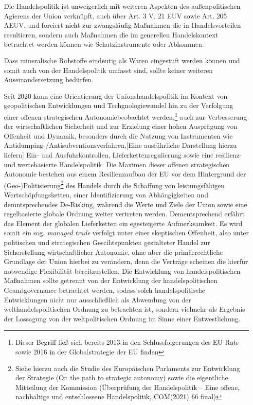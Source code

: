 \documentclass[12pt,a4paper,oneside]{book} %
\begin{document}
Die Handelspolitik ist unweigerlich mit weiteren Aspekten des außenpolitischen Agierens der Union verknüpft, auch über Art. 3 V, 21 EUV sowie Art. 205 AEUV, und forciert nicht zur zwangsläufig Maßnahmen die in Handelsvorteilen resultieren, sondern auch Maßnahmen die im generellen Handelskontext betrachtet werden können wie Schutzinstrumente oder Abkommen.\autocite{Callies/Ruffert, Art. 206, Rn 3.}

Dass mineralische Rohstoffe eindeutig als Waren eingestuft werden können und somit auch von der Handelspolitik umfasst sind, sollte keiner weiteren Auseinandersetzung bedürfen.
	

	
	Seit 2020 kann eine Orientierung der Unionshandelspolitik im Kontext von geopolitischen Entwicklungen und Techgnologiewandel hin zu der Verfolgung einer \glqq offenen strategischen Autonomie\grqq beobachtet werden,\footnote{Dieser Begriff ließ sich bereits 2013 in den Schlussfolgerungen des EU-Rats sowie 2016 in der Globalstrategie der EU finden} auch zur Verbesserung der wirtschaftlichen Sicherheit und zur Erzielung einer hohen Ausprägung von Offenheit und Dynamik, besonders durch die Nutzung von Instrumenten wie Antidumping-/Antisubventionsverfahren,[Eine ausführliche Darstellung hierzu liefern]\autocite{Müller-Ibold/Herrmann, EuZW 2022, 1085} Ein- und Ausfuhrkontrollen, Lieferkettenregulierung sowie eine resilienz- und wertebasierte Handelspolitik.\autocite{Paschke, RdTW 2024, 206; Schäffer/Hach, ZRP 2023, 207f; Müller-Ibold, EuZW 2022, 1029, 1034} Die Maximen dieser offenen strategischen Autonomie bestehen aus einem Resilienzaufbau der EU vor dem Hintergrund der (Geo-)Politisierung\footnote{Siehe hierzu auch die Studie des Europäischen Parlaments zur Entwicklung der Strategie (On the path to \glq strategic autonomy\grq) sowie die eigentliche Mitteilung der Kommission (\glqq Überprüfung der Handelspolitik -- Eine offene, nachhaltige und entschlossene Handelspolitik\grqq, COM(2021) 66 final)} des Handels durch die Schaffung von leistungsfähigen Wertschöpfungsketten, einer Identifizierung von Abhängigkeiten und demntsprechendes De-Risking, während die Werte und Ziele der Union sowie eine regelbasierte globale Ordnung weiter vertreten werden.\autocite{Schäffer/hach, ZRP 2023, 207} Dementsprechend erfährt das Element der globalen Lieferketten ein egesteigerte Aufmerksamkeit.\autocite{bibid} Es wird somit ein sog. \textit{managed trade} verfolgt unter einer \glqq skeptischen Offenheit\grqq, also unter politischen und strategischen Gescihtspunkten gestalteter Handel zur Sicherstellung wirtschaftlicher Autonomie, ohne aber die primärrechtliche Grundlage der Union hierbei zu verändern, denn die Verträge scheinen die hierfür notwendige Flexibilität bereitzustellen.\autocite[so zumindest]{Paschke, RdTW 2024, 206, 216; Schäffer, EuZW 2023, 695, 700} Die Entwicklung von handelspolitischen Maßnahmen sollte getrennt von der Entwicklung der handelspolitischen Geamtgovernance betrachtet werden, sodass solch handelspolitische Entwicklungen nicht nur ausschließlich als Abwendung von der welthandelspolitischen Ordnung zu betrachten ist, sondern vielmehr als Ergebnis der Lossagung von der weltpolitischen Ordnung im Sinne einer \glqq Entwestlichung\grqq.\autocite{Altemöller, EuZW 2019, 321ff} 
\end{document}
